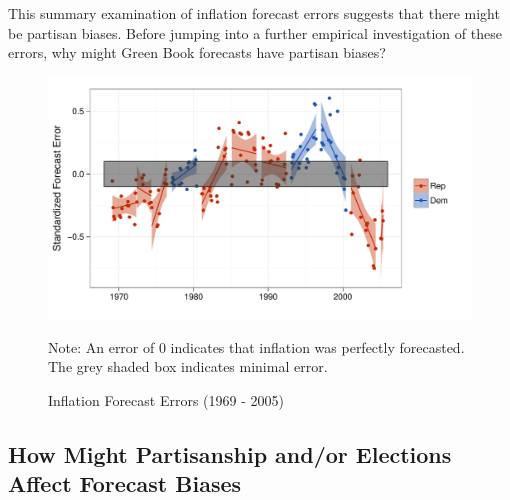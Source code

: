 \documentclass[a4paper]{article}\usepackage{graphicx, color}
\newenvironment{knitrout}{}{} %
\begin{document}
This summary examination of inflation forecast errors suggests that there might be partisan biases. Before jumping into a further empirical investigation of these errors, why might Green Book forecasts have partisan biases?

\begin{figure}[t]
    \caption{Inflation Forecast Errors (1969 - 2005)}
    \label{errors_over_time}
    \begin{center}
    
\begin{knitrout}
\color{fgcolor}\includegraphics[width=0.8\linewidth]{figure/partisanError} 
\end{knitrout}

    
    \end{center}
    \begin{singlespace}
        {\scriptsize{Note: An error of 0 indicates that inflation was perfectly forecasted. \\
            The grey shaded box indicates minimal error.
        }}
    \end{singlespace}
\end{figure}


\subsection{How Might Partisanship and/or Elections Affect Forecast Biases}




\end{document}
